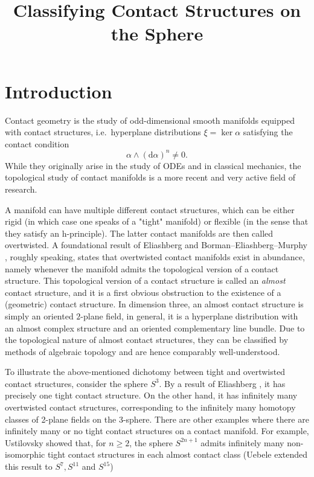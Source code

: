 \documentclass{amsart}
\renewcommand*{\d}{\mathrm{d}}
\begin{document}
\title{Classifying Contact Structures on the Sphere}
\address{}
\date{}

\maketitle
\section*{Introduction}
Contact geometry is the study of odd-dimensional smooth manifolds equipped with contact structures, i.e.\ hyperplane distributions $\xi = \ker \alpha$ satisfying the contact condition
\[
    \alpha \wedge (\d \alpha)^n \neq 0.
\]
While they originally arise in the study of ODEs and in classical mechanics, the topological study of contact manifolds is a more recent and very active field of research.

A manifold can have multiple different contact structures, which can be either rigid (in which case one speaks of a "tight" manifold) or flexible (in the sense that they satisfy an h-principle). The latter contact manifolds are then called overtwisted. A foundational result of Eliashberg \cite{Eliashberg89} and Borman--Eliashberg--Murphy \cite{BEM15}, roughly speaking, states that overtwisted contact manifolds exist in abundance, namely whenever the manifold admits the topological version of a contact structure.
This topological version of a contact structure is called an \emph{almost} contact structure, and it is a first obvious obstruction to the existence of a (geometric) contact structure. 
In dimension three, an almost contact structure is simply an oriented $2$-plane field,
in general, it is a hyperplane distribution with an almost complex structure
and an oriented complementary line bundle.
Due to the topological nature of almost contact structures, they can be classified
by methods of algebraic topology and are hence comparably well-understood.

To illustrate the above-mentioned dichotomy between tight and overtwisted contact structures, consider the sphere $S^3$. By a result of Eliashberg \cite{Eliashberg92}, it has precisely one tight contact structure. On the other hand, it has infinitely many overtwisted contact structures, corresponding to the infinitely many homotopy classes of 2-plane fields on the 3-sphere. There are other examples where there are infinitely many or no tight contact structures on a contact manifold.
For example, Ustilovsky \cite{Ustilovsky99} showed that, for $n \geq 2$, the sphere 
$S^{2n+1}$ admits infinitely many non-isomorphic tight contact structures in each almost 
contact class (Uebele \cite{Uebele16} extended this result to $S^7, S^{11}$ and $S^{15}$)
\end{document}
